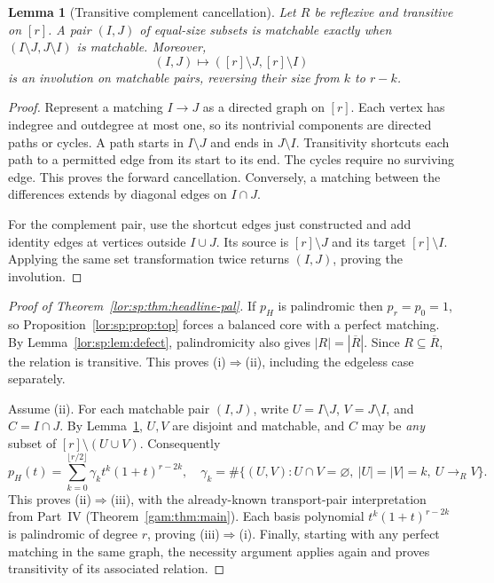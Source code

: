 \documentclass[11pt]{article}
\numberwithin{equation}{section}
\newtheorem{lemma}[theorem]{Lemma}
\theoremstyle{definition}
\begin{document}
\begin{lemma}[Transitive complement cancellation]
\label{lor:sp:lem:cancel}
Let $R$ be reflexive and transitive on $[r]$. A pair $(I,J)$ of equal-size
subsets is matchable exactly when $(I\setminus J,J\setminus I)$ is matchable.
Moreover,
\begin{equation}
 (I,J)\longmapsto([r]\setminus J,[r]\setminus I)
 \label{lor:sp:eq:palmap}
\end{equation}
is an involution on matchable pairs, reversing their size from $k$ to $r-k$.
\end{lemma}
\begin{proof}
Represent a matching $I\to J$ as a directed graph on $[r]$. Each vertex has
indegree and outdegree at most one, so its nontrivial components are directed
paths or cycles. A path starts in $I\setminus J$ and ends in $J\setminus I$.
Transitivity shortcuts each path to a permitted edge from its start to its end.
The cycles require no surviving edge. This proves the forward cancellation.
Conversely, a matching between the differences extends by diagonal edges on
$I\cap J$.

For the complement pair, use the shortcut edges just constructed and add
identity edges at vertices outside $I\cup J$. Its source is
$[r]\setminus J$ and its target $[r]\setminus I$. Applying the same set
transformation twice returns $(I,J)$, proving the involution.
\end{proof}

\begin{proof}[Proof of Theorem~\ref{lor:sp:thm:headline-pal}]
If $p_H$ is palindromic then $p_r=p_0=1$, so Proposition~\ref{lor:sp:prop:top} forces a balanced
core with a perfect matching. By Lemma~\ref{lor:sp:lem:defect}, palindromicity also gives
$|R|=|\overline R|$. Since $R\subseteq\overline R$, the relation is transitive.
This proves (i)$\Rightarrow$(ii), including the edgeless case separately.

Assume (ii). For each matchable pair $(I,J)$, write
$U=I\setminus J$, $V=J\setminus I$, and $C=I\cap J$.
By Lemma~\ref{lor:sp:lem:cancel}, $U,V$ are disjoint and matchable, and $C$ may be
\emph{any} subset of $[r]\setminus(U\cup V)$. Consequently
\begin{equation}
 p_H(t)=\sum_{k=0}^{\lfloor r/2\rfloor}\gamma_k t^k(1+t)^{r-2k},
 \quad
 \gamma_k=\#\{(U,V):U\cap V=\varnothing,\ |U|=|V|=k,\ U\to_R V\}.
 \label{lor:sp:eq:gamma}
\end{equation}
This proves (ii)$\Rightarrow$(iii), with the already-known transport-pair
interpretation from Part~IV (Theorem~\ref{gam:thm:main}). Each basis polynomial
$t^k(1+t)^{r-2k}$ is palindromic of degree $r$, proving (iii)$\Rightarrow$(i).
Finally, starting with any perfect matching in the same graph, the necessity
argument applies again and proves transitivity of its associated relation.
\end{proof}
\end{document}
